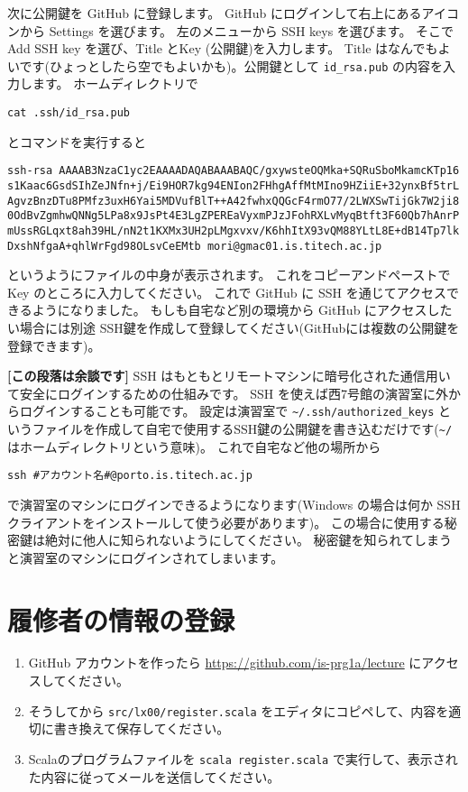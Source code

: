 \documentclass[a4paper]{article}
\begin{document}
次に公開鍵を GitHub に登録します。
GitHub にログインして右上にあるアイコンから Settings を選びます。
左のメニューから SSH keys を選びます。
そこで Add SSH key を選び、Title  とKey (公開鍵)を入力します。
Title はなんでもよいです(ひょっとしたら空でもよいかも)。公開鍵として \texttt{id\_rsa.pub} の内容を入力します。
ホームディレクトリで
\begin{verbatim}
cat .ssh/id_rsa.pub
\end{verbatim}
とコマンドを実行すると
\begin{verbatim}
ssh-rsa AAAAB3NzaC1yc2EAAAADAQABAAABAQC/gxywsteOQMka+SQRuSboMkamcKTp16
s1Kaac6GsdSIhZeJNfn+j/Ei9HOR7kg94ENIon2FHhgAffMtMIno9HZiiE+32ynxBf5trL
AgvzBnzDTu8PMfz3uxH6Yai5MDVufBlT++A42fwhxQQGcF4rmO77/2LWXSwTijGk7W2ji8
0OdBvZgmhwQNNg5LPa8x9JsPt4E3LgZPEREaVyxmPJzJFohRXLvMyqBtft3F60Qb7hAnrP
mUssRGLqxt8ah39HL/nN2t1KXMx3UH2pLMgxvxv/K6hhItX93vQM88YLtL8E+dB14Tp7lk
DxshNfgaA+qhlWrFgd98OLsvCeEMtb mori@gmac01.is.titech.ac.jp
\end{verbatim}
というようにファイルの中身が表示されます。
これをコピーアンドペーストで Key のところに入力してください。
%
これで GitHub に SSH を通じてアクセスできるようになりました。
もしも自宅など別の環境から GitHub にアクセスしたい場合には別途 SSH鍵を作成して登録してください(GitHubには複数の公開鍵を登録できます)。

\textbf{[この段落は余談です]} SSH はもともとリモートマシンに暗号化された通信用いて安全にログインするための仕組みです。
SSH を使えば西7号館の演習室に外からログインすることも可能です。
設定は演習室で \texttt{\~{}/.ssh/authorized\_keys} というファイルを作成して自宅で使用するSSH鍵の公開鍵を書き込むだけです(\texttt{\~{}/}はホームディレクトリという意味)。
これで自宅など他の場所から
\begin{verbatim}
ssh #アカウント名#@porto.is.titech.ac.jp
\end{verbatim}
で演習室のマシンにログインできるようになります(Windows の場合は何か SSH クライアントをインストールして使う必要があります)。
この場合に使用する秘密鍵は絶対に他人に知られないようにしてください。
秘密鍵を知られてしまうと演習室のマシンにログインされてしまいます。


\section{履修者の情報の登録}
\begin{enumerate}
\item GitHub アカウントを作ったら \url{https://github.com/is-prg1a/lecture} にアクセスしてください。
\item そうしてから \texttt{src/lx00/register.scala} をエディタにコピペして、内容を適切に書き換えて保存してください。
\item Scalaのプログラムファイルを \texttt{scala register.scala} で実行して、表示された内容に従ってメールを送信してください。
\end{enumerate}
\end{document}
